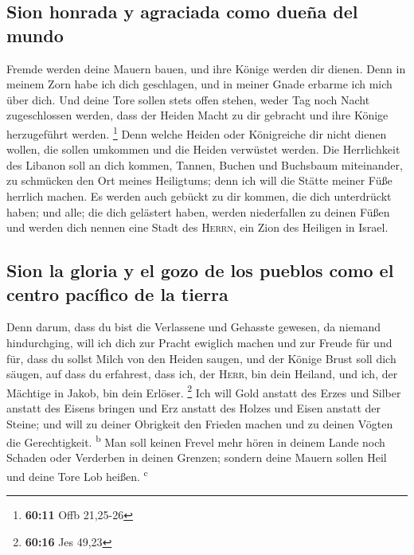 \hypertarget{sion-honrada-y-agraciada-como-dueuxf1a-del-mundo}{%
\subsection{Sion honrada y agraciada como dueña del
mundo}\label{sion-honrada-y-agraciada-como-dueuxf1a-del-mundo}}

 Fremde werden deine Mauern bauen, und ihre Könige werden
dir dienen. Denn in meinem Zorn habe ich dich geschlagen, und in meiner
Gnade erbarme ich mich über dich.  Und deine Tore sollen
stets offen stehen, weder Tag noch Nacht zugeschlossen werden, dass der
Heiden Macht zu dir gebracht und ihre Könige herzugeführt werden.
\footnote{\textbf{60:11} Offb 21,25-26}  Denn welche
Heiden oder Königreiche dir nicht dienen wollen, die sollen umkommen und
die Heiden verwüstet werden.  Die Herrlichkeit des
Libanon soll an dich kommen, Tannen, Buchen und Buchsbaum miteinander,
zu schmücken den Ort meines Heiligtums; denn ich will die Stätte meiner
Füße herrlich machen.  Es werden auch gebückt zu dir
kommen, die dich unterdrückt haben; und alle; die dich gelästert haben,
werden niederfallen zu deinen Füßen und werden dich nennen eine Stadt
des \textsc{Herrn}, ein Zion des Heiligen in Israel.

\hypertarget{sion-la-gloria-y-el-gozo-de-los-pueblos-como-el-centro-pacuxedfico-de-la-tierra}{%
\subsection{Sion la gloria y el gozo de los pueblos como el centro
pacífico de la
tierra}\label{sion-la-gloria-y-el-gozo-de-los-pueblos-como-el-centro-pacuxedfico-de-la-tierra}}

 Denn darum, dass du bist die Verlassene und Gehasste
gewesen, da niemand hindurchging, will ich dich zur Pracht ewiglich
machen und zur Freude für und für,  dass du sollst Milch
von den Heiden saugen, und der Könige Brust soll dich säugen, auf dass
du erfahrest, dass ich, der \textsc{Herr}, bin dein Heiland, und ich,
der Mächtige in Jakob, bin dein Erlöser. \footnote{\textbf{60:16} Jes
  49,23}  Ich will Gold anstatt des Erzes und Silber
anstatt des Eisens bringen und Erz anstatt des Holzes und Eisen anstatt
der Steine; und will zu deiner Obrigkeit den Frieden machen und zu
deinen Vögten die Gerechtigkeit. \textsuperscript{b}  Man
soll keinen Frevel mehr hören in deinem Lande noch Schaden oder
Verderben in deinen Grenzen; sondern deine Mauern sollen Heil und deine
Tore Lob heißen. \textsuperscript{c}

